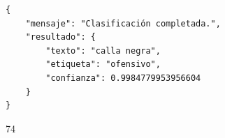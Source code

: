 \newpage


\begin{lstlisting}[style=jsoncode]
{
    "mensaje": "Clasificación completada.",
    "resultado": {
        "texto": "calla negra",
        "etiqueta": "ofensivo",
        "confianza": 0.9984779953956604
    }
}
\end{lstlisting}

\begin{center}
74
\end{center}

\newpage

\thispagestyle{plain}


